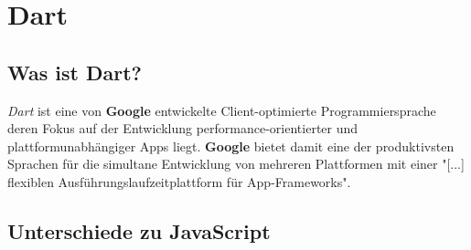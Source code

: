 \section{Dart}

\subsection{Was ist Dart?}

\textit{Dart} ist eine von \textbf{Google} entwickelte Client-optimierte Programmiersprache deren
Fokus auf der Entwicklung performance-orientierter und plattformunabhängiger Apps liegt.
\textbf{Google} bietet damit eine der produktivsten Sprachen für die simultane Entwicklung von
mehreren Plattformen mit einer "[...] flexiblen Ausführungslaufzeitplattform für App-Frameworks".

\subsection{Unterschiede zu JavaScript}